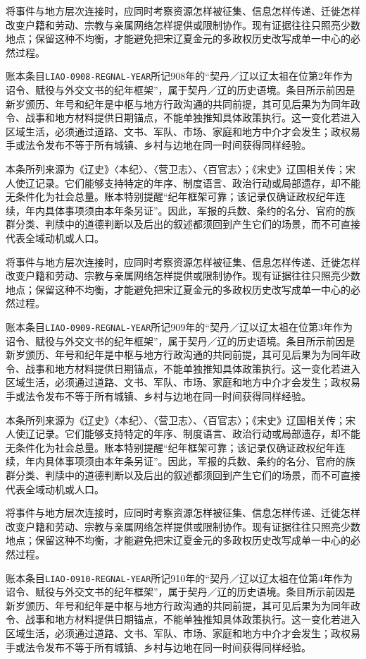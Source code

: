 将事件与地方层次连接时，应同时考察资源怎样被征集、信息怎样传递、迁徙怎样改变户籍和劳动、宗教与亲属网络怎样提供或限制协作。现有证据往往只照亮少数地点；保留这种不均衡，才能避免把宋辽夏金元的多政权历史改写成单一中心的必然过程。

账本条目\texttt{LIAO-0908-REGNAL-YEAR}所记908年的“契丹／辽以辽太祖在位第2年作为诏令、赋役与外交文书的纪年框架”，属于契丹／辽的历史语境。条目所示前因是新岁颁历、年号和纪年是中枢与地方行政沟通的共同前提，其可见后果为为同年政令、战事和地方材料提供日期锚点，不能单独推知具体政策执行。这一变化若进入区域生活，必须通过道路、文书、军队、市场、家庭和地方中介才会发生；政权易手或法令发布不等于所有城镇、乡村与边地在同一时间获得同样经验。

本条所列来源为《辽史》〈本纪〉、〈营卫志〉、〈百官志〉；《宋史》辽国相关传；宋人使辽记录。它们能够支持特定的年序、制度语言、政治行动或局部遗存，却不能无条件化为社会总量。账本特别提醒“纪年框架可靠；该记录仅确证政权纪年连续，年内具体事项须由本年条另证”。因此，军报的兵数、条约的名分、官府的族群分类、判牍中的道德判断以及后出的叙述都须回到产生它们的场景，而不可直接代表全域动机或人口。

将事件与地方层次连接时，应同时考察资源怎样被征集、信息怎样传递、迁徙怎样改变户籍和劳动、宗教与亲属网络怎样提供或限制协作。现有证据往往只照亮少数地点；保留这种不均衡，才能避免把宋辽夏金元的多政权历史改写成单一中心的必然过程。

账本条目\texttt{LIAO-0909-REGNAL-YEAR}所记909年的“契丹／辽以辽太祖在位第3年作为诏令、赋役与外交文书的纪年框架”，属于契丹／辽的历史语境。条目所示前因是新岁颁历、年号和纪年是中枢与地方行政沟通的共同前提，其可见后果为为同年政令、战事和地方材料提供日期锚点，不能单独推知具体政策执行。这一变化若进入区域生活，必须通过道路、文书、军队、市场、家庭和地方中介才会发生；政权易手或法令发布不等于所有城镇、乡村与边地在同一时间获得同样经验。

本条所列来源为《辽史》〈本纪〉、〈营卫志〉、〈百官志〉；《宋史》辽国相关传；宋人使辽记录。它们能够支持特定的年序、制度语言、政治行动或局部遗存，却不能无条件化为社会总量。账本特别提醒“纪年框架可靠；该记录仅确证政权纪年连续，年内具体事项须由本年条另证”。因此，军报的兵数、条约的名分、官府的族群分类、判牍中的道德判断以及后出的叙述都须回到产生它们的场景，而不可直接代表全域动机或人口。

将事件与地方层次连接时，应同时考察资源怎样被征集、信息怎样传递、迁徙怎样改变户籍和劳动、宗教与亲属网络怎样提供或限制协作。现有证据往往只照亮少数地点；保留这种不均衡，才能避免把宋辽夏金元的多政权历史改写成单一中心的必然过程。

账本条目\texttt{LIAO-0910-REGNAL-YEAR}所记910年的“契丹／辽以辽太祖在位第4年作为诏令、赋役与外交文书的纪年框架”，属于契丹／辽的历史语境。条目所示前因是新岁颁历、年号和纪年是中枢与地方行政沟通的共同前提，其可见后果为为同年政令、战事和地方材料提供日期锚点，不能单独推知具体政策执行。这一变化若进入区域生活，必须通过道路、文书、军队、市场、家庭和地方中介才会发生；政权易手或法令发布不等于所有城镇、乡村与边地在同一时间获得同样经验。


